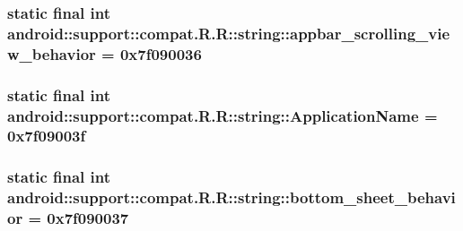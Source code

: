 \hypertarget{classandroid_1_1support_1_1compat_1_1_r_1_1string_a7dae9382acc6ca2f333b27e662b65d6}{
\subsubsection[{appbar\_\-scrolling\_\-view\_\-behavior}]{\setlength{\rightskip}{0pt plus 5cm}static final int android::support::compat.R.R::string::appbar\_\-scrolling\_\-view\_\-behavior = 0x7f090036}}
\label{classandroid_1_1support_1_1compat_1_1_r_1_1string_a7dae9382acc6ca2f333b27e662b65d6}


\hypertarget{classandroid_1_1support_1_1compat_1_1_r_1_1string_0cc1d1fd76d8c50a087cfc5979c325ee}{
\subsubsection[{ApplicationName}]{\setlength{\rightskip}{0pt plus 5cm}static final int android::support::compat.R.R::string::ApplicationName = 0x7f09003f}}
\label{classandroid_1_1support_1_1compat_1_1_r_1_1string_0cc1d1fd76d8c50a087cfc5979c325ee}


\hypertarget{classandroid_1_1support_1_1compat_1_1_r_1_1string_f6cc1e45c5b3cd9c881eb29201010747}{
\subsubsection[{bottom\_\-sheet\_\-behavior}]{\setlength{\rightskip}{0pt plus 5cm}static final int android::support::compat.R.R::string::bottom\_\-sheet\_\-behavior = 0x7f090037}}
\label{classandroid_1_1support_1_1compat_1_1_r_1_1string_f6cc1e45c5b3cd9c881eb29201010747}


